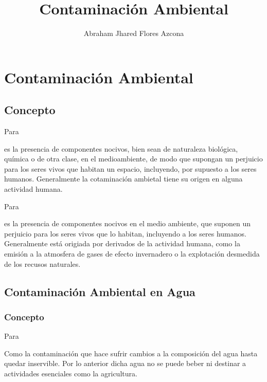 \documentclass[stu, 12pt, letterpaper, donotrepeattitle, floatsintext, natbib]{apa7}
\title{\Large Contaminación Ambiental}
\author{Abraham Jhared Flores Azcona} %
\affiliation{Instituto Tecnológico de Tijuana}
\begin{document}
\maketitle


\renewcommand\contentsname{Contenido}
\tableofcontents

\newpage
\section{Contaminación Ambiental}
\subsection{Concepto}
Para \cite{romero-2021} %
\begin{justifying}
  es la presencia de componentes nocivos, bien sean de naturaleza biológica, química o de otra clase, en el medioambiente,
  de modo que supongan un perjuicio para los seres vivos que habitan un espacio, incluyendo, por supuesto a los seres humanos.
  Generalmente la cotaminación ambietal tiene su origen en alguna actividad humana.\par
\end{justifying}
Para \cite{unknown-author-no-dateA} %
\begin{justifying}
  es la presencia de componentes nocivos en el medio ambiente, que suponen un perjuicio para los seres vivos que lo habitan, incluyendo
  a los seres humanos. Generalmente está origiada por derivados de la actividad humana, como la emisión a la atmosfera de gases de
  efecto invernadero o la explotación desmedida de los recusos naturales.\par
\end{justifying}
\vspace{\baselineskip}
\subsection{Contaminación Ambiental en Agua}
\subsubsection{Concepto}
Para \cite{unknown-author-2020} %
\begin{justifying}
  Como la contaminación que hace sufrir cambios a la composición del agua hasta quedar inservible. Por lo anterior
  dicha agua no se puede beber ni destinar a actividades esenciales como la agricultura.\par
\end{justifying}
\vspace{\baselineskip}
\end{document}
